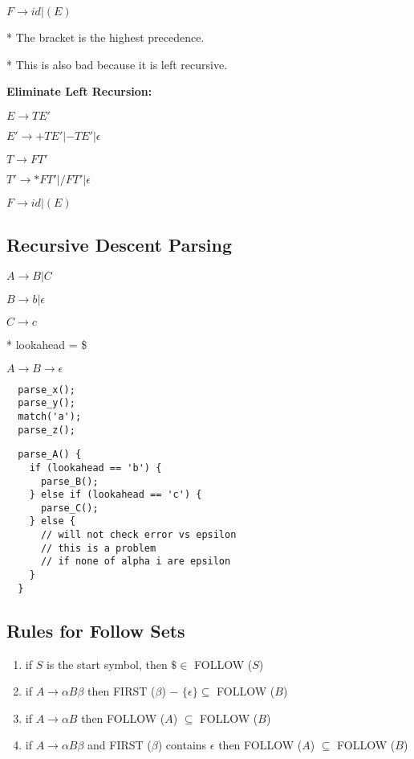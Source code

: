 \documentclass[twocolumn]{article}
\begin{document}
$F \to id | (E)$

* The bracket is the highest precedence.

* This is also bad because it is left recursive.

\textbf{Eliminate Left Recursion:}

$E \to TE'$

$E' \to + TE' | - TE' | \mathcal{\epsilon}$

$T \to FT'$

$T' \to * FT' | / FT' | \mathcal{\epsilon}$

$F \to id | (E)$


\subsection{Recursive Descent Parsing}

$A \to B | C$

$B \to b | \epsilon$

$C \to c$

* lookahead = \$

$A \to B \to \epsilon$

\begin{verbatim}
  parse_x();
  parse_y();
  match('a');
  parse_z();
\end{verbatim}

\newpage

\begin{verbatim}
  parse_A() {
    if (lookahead == 'b') {
      parse_B();
    } else if (lookahead == 'c') {
      parse_C();
    } else {
      // will not check error vs epsilon
      // this is a problem
      // if none of alpha i are epsilon
    }
  }
\end{verbatim}

\subsection{Rules for Follow Sets}

\begin{enumerate}
  \item if $S$ is the start symbol, then $\$ \in$ FOLLOW ($S$)
  \item if $A \to \alpha B \beta$ then FIRST ($\beta$) $-$ $\{\mathcal{\epsilon}\} \subseteq$ FOLLOW ($B$)
  \item if $A \to \alpha B$ then FOLLOW ($A$) $\subseteq$ FOLLOW ($B$)
  \item if $A \to \alpha B \beta$ and FIRST ($\beta$) contains $\mathcal{\epsilon}$ then FOLLOW ($A$) $\subseteq$ FOLLOW ($B$)
\end{enumerate}
\end{document}
